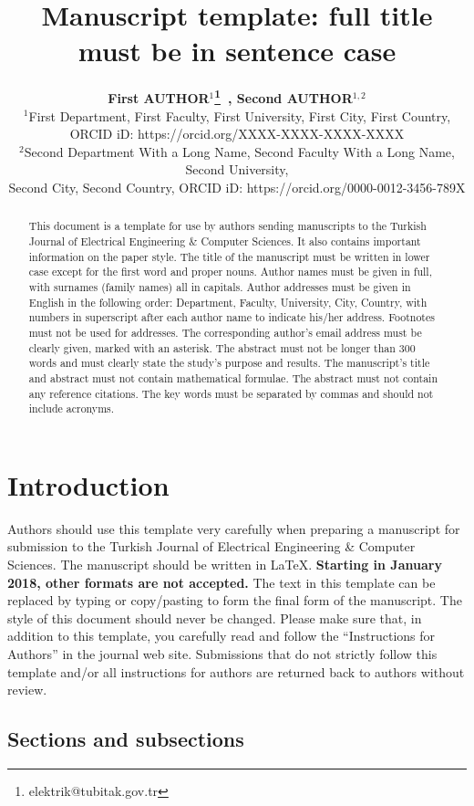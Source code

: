 \documentclass{elektr}
\title{Manuscript template: full title must be in sentence case}
\author[AUTHOR and AUTHOR]{
\textbf{First AUTHOR$^{1}$\thanks{elektrik@tubitak.gov.tr}~, Second AUTHOR$^{1,2}$}\\
$^{1}$First Department, First Faculty, First University, First City, First Country, \\ ORCID iD: https://orcid.org/XXXX-XXXX-XXXX-XXXX\\
$^{2}$Second Department With a Long Name, Second Faculty With a Long Name, Second University,\\ Second City, Second Country, ORCID iD: https://orcid.org/0000-0012-3456-789X
\\ [1.8em]

\rec{.202}
\acc{.202}
\finv{..202}
}
\begin{document}
\maketitle


\begin{abstract}This document is a template for use by authors sending manuscripts to the Turkish Journal of Electrical Engineering {\&} Computer Sciences. It also contains important information on the paper style. The title of the manuscript must be written in lower case except for the first word and proper nouns. Author names must be given in full, with surnames (family names) all in capitals. Author addresses must be given in English in the following order: Department, Faculty, University, City, Country, with numbers in superscript after each author name to indicate his/her address. Footnotes must not be used for addresses. The corresponding author's email address must be clearly given, marked with an asterisk. The abstract must not be longer than 300 words and must clearly state the study's purpose and results. The manuscript's title and abstract must not contain mathematical formulae. The abstract must not contain any reference citations. The key words must be separated by commas and should not include acronyms.

\end{abstract}

\section{Introduction}
\label{Int}

Authors should use this template very carefully when preparing a manuscript for submission to the Turkish Journal of Electrical Engineering {\&} Computer Sciences. The manuscript should be written in \LaTeX. \textbf{Starting in January 2018, other formats are not accepted.} The text in this template can be replaced by typing or copy/pasting to form the final form of the manuscript. The style of this document should never be changed. Please make sure that, in addition to this template, you carefully read and follow the ``Instructions for Authors'' in the journal web site. Submissions that do not strictly follow this template and/or all instructions for authors are returned back to authors without review.

\subsection{Sections and subsections}
\end{document}
